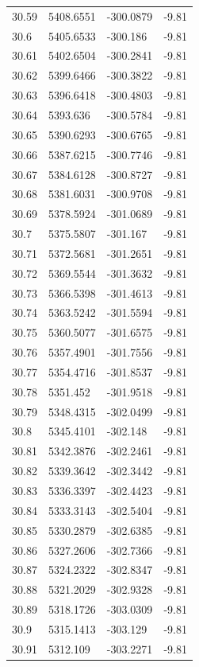 \begin{table}[H]
\begin{tabular}{llll}
30.59 & 5408.6551 & -300.0879 & -9.81 \\
30.6 & 5405.6533 & -300.186 & -9.81 \\
30.61 & 5402.6504 & -300.2841 & -9.81 \\
30.62 & 5399.6466 & -300.3822 & -9.81 \\
30.63 & 5396.6418 & -300.4803 & -9.81 \\
30.64 & 5393.636 & -300.5784 & -9.81 \\
30.65 & 5390.6293 & -300.6765 & -9.81 \\
30.66 & 5387.6215 & -300.7746 & -9.81 \\
30.67 & 5384.6128 & -300.8727 & -9.81 \\
30.68 & 5381.6031 & -300.9708 & -9.81 \\
30.69 & 5378.5924 & -301.0689 & -9.81 \\
30.7 & 5375.5807 & -301.167 & -9.81 \\
30.71 & 5372.5681 & -301.2651 & -9.81 \\
30.72 & 5369.5544 & -301.3632 & -9.81 \\
30.73 & 5366.5398 & -301.4613 & -9.81 \\
30.74 & 5363.5242 & -301.5594 & -9.81 \\
30.75 & 5360.5077 & -301.6575 & -9.81 \\
30.76 & 5357.4901 & -301.7556 & -9.81 \\
30.77 & 5354.4716 & -301.8537 & -9.81 \\
30.78 & 5351.452 & -301.9518 & -9.81 \\
30.79 & 5348.4315 & -302.0499 & -9.81 \\
30.8 & 5345.4101 & -302.148 & -9.81 \\
30.81 & 5342.3876 & -302.2461 & -9.81 \\
30.82 & 5339.3642 & -302.3442 & -9.81 \\
30.83 & 5336.3397 & -302.4423 & -9.81 \\
30.84 & 5333.3143 & -302.5404 & -9.81 \\
30.85 & 5330.2879 & -302.6385 & -9.81 \\
30.86 & 5327.2606 & -302.7366 & -9.81 \\
30.87 & 5324.2322 & -302.8347 & -9.81 \\
30.88 & 5321.2029 & -302.9328 & -9.81 \\
30.89 & 5318.1726 & -303.0309 & -9.81 \\
30.9 & 5315.1413 & -303.129 & -9.81 \\
30.91 & 5312.109 & -303.2271 & -9.81 \\

\end{tabular}
\end{table}
